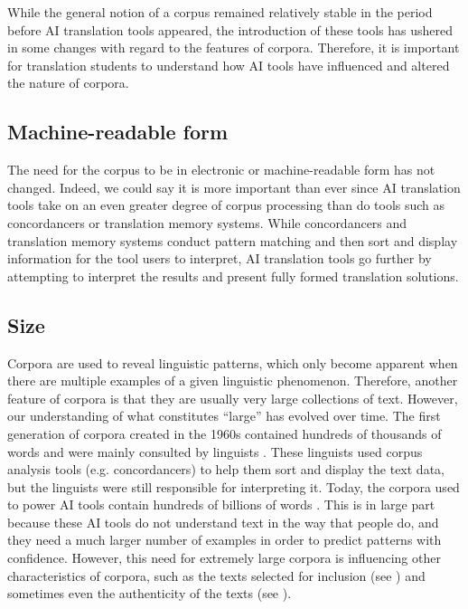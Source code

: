 \documentclass[output=paper]{langscibook}
\begin{document}
While the general notion of a corpus remained relatively stable in the period before AI translation tools appeared, the introduction of these tools has ushered in some changes with regard to the features of corpora. Therefore, it is important for translation students to understand how AI tools have influenced and altered the nature of corpora.

\subsection{Machine-readable form}\label{sec:4:2.1.1}
The need for the corpus to be in electronic or machine-readable form has not changed. Indeed, we could say it is more important than ever since AI translation tools take on an even greater degree of corpus processing than do tools such as concordancers or translation memory systems. While concordancers and translation memory systems conduct pattern matching and then sort and display information for the tool users to interpret, AI translation tools go further by attempting to interpret the results and present fully formed translation solutions.

\subsection{Size}\label{sec:4:2.1.2}
Corpora are used to reveal linguistic patterns, which only become apparent when there are multiple examples of a given linguistic phenomenon. Therefore, another feature of corpora is that they are usually very large collections of text. However, our understanding of what constitutes “large” has evolved over time. The first generation of corpora created in the 1960s contained hundreds of thousands of words and were mainly consulted by linguists \citep{mcenery22}. These linguists used corpus analysis tools (e.g. concordancers) to help them sort and display the text data, but the linguists were still responsible for interpreting it. Today, the corpora used to power AI tools contain hundreds of billions of words \citep{hughes23}. This is in large part because these AI tools do not understand text in the way that people do, and they need a much larger number of examples in order to predict patterns with confidence. However, this need for extremely large corpora is influencing other characteristics of corpora, such as the texts selected for inclusion (see ) and sometimes even the authenticity of the texts (see ).
\end{document}
